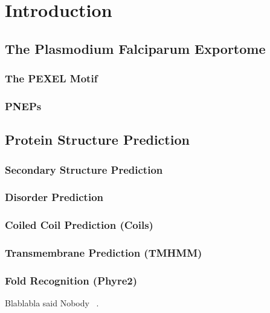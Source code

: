 \documentclass[fleqn,10pt]{SelfArx} %
\begin{document}
\flushbottom %

\maketitle %

\tableofcontents %

\thispagestyle{empty} %


\section{Introduction} 
\subsection{The Plasmodium Falciparum Exportome}
\subsubsection*{The PEXEL Motif}
\subsubsection*{PNEPs}
\subsection{Protein Structure Prediction}
\subsubsection*{Secondary Structure Prediction}
\subsubsection*{Disorder Prediction}
\subsubsection*{Coiled Coil Prediction (Coils)}
\subsubsection*{Transmembrane Prediction (TMHMM)}
\subsubsection*{Fold Recognition (Phyre2)}
Blablabla said Nobody ~\cite{Nobody06}.
\end{document}

